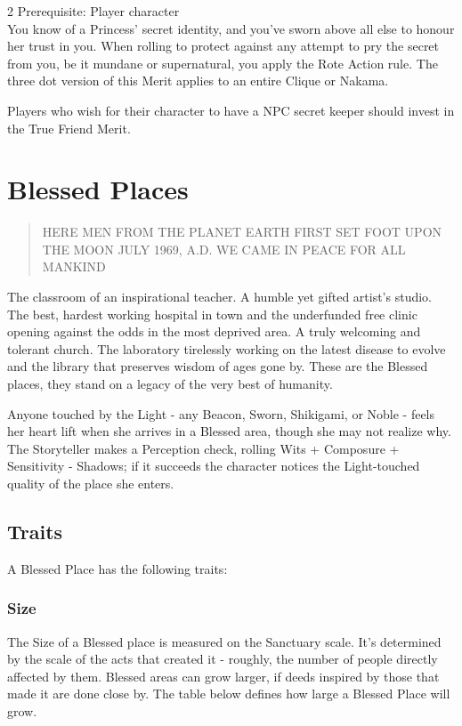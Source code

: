 \begin{multicols}{2}
Prerequisite: Player character\\

\noindent You know of a Princess' secret identity, and you've sworn above all else to honour her trust in you. When rolling to protect against any attempt to pry the secret from you, be it mundane or supernatural, you apply the Rote Action rule. The three dot version of this Merit applies to an entire Clique or Nakama. 

Players who wish for their character to have a NPC secret keeper should invest in the True Friend Merit. 



\section*{Blessed Places}
\label{sec:BlessedPlaces}


\begin{quote}
HERE MEN FROM THE PLANET EARTH FIRST SET FOOT UPON THE MOON
JULY 1969, A.D.
WE CAME IN PEACE FOR ALL MANKIND
 \end{quote}
 
The classroom of an inspirational teacher. A humble yet gifted artist's studio. The best, hardest working hospital in town and the underfunded free clinic opening against the odds in the most deprived area. A truly welcoming and tolerant church. The laboratory tirelessly working on the latest disease to evolve and the library that preserves wisdom of ages gone by. These are the Blessed places, they stand on a legacy of the very best of humanity.
 
Anyone touched by the Light - any Beacon, Sworn, Shikigami, or Noble - feels her heart lift when she arrives in a Blessed area, though she may not realize why. The Storyteller makes a Perception check, rolling Wits + Composure + Sensitivity - Shadows; if it succeeds the character notices the Light-touched quality of the place she enters.
 
\subsection*{Traits}

A Blessed Place has the following traits:

\subsubsection*{Size}

The Size of a Blessed place is measured on the Sanctuary scale. It’s determined by the scale of the acts that created it - roughly, the number of people directly affected by them. Blessed areas can grow larger, if deeds inspired by those that made it are done close by. The table below defines how large a Blessed Place will grow. 


\end{multicols}

